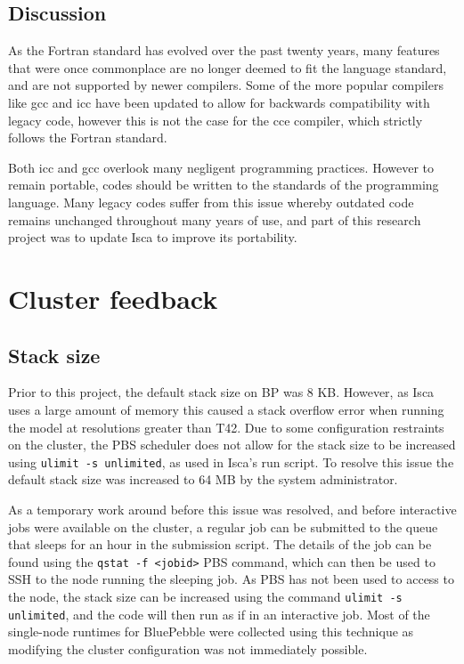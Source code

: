 \documentclass[a4paper,11pt]{report}
\begin{document}
\subsection{Discussion}
As the Fortran standard has evolved over the past twenty years, many features that were once commonplace are no longer deemed to fit the language standard, and are not supported by newer compilers. Some of the more popular compilers like \gls{gcc} and \gls{icc} have been updated to allow for backwards compatibility with legacy code, however this is not the case for the \gls{cce} compiler, which strictly follows the Fortran standard.
\par
Both \gls{icc} and \gls{gcc} overlook many negligent programming practices. However to remain portable, codes should be written to the standards of the programming language. Many legacy codes suffer from this issue whereby outdated code remains unchanged throughout many years of use, and part of this research project was to update Isca to improve its portability.


\section{Cluster feedback}
\subsection{Stack size}
Prior to this project, the default stack size on BP was 8 KB. However, as Isca uses a large amount of memory this caused a stack overflow error when running the model at resolutions greater than T42. Due to some configuration restraints on the cluster, the PBS scheduler does not allow for the stack size to be increased using \texttt{ulimit -s unlimited}, as used in Isca's run script. To resolve this issue the default stack size was increased to 64 MB by the system administrator.
\par
As a temporary work around before this issue was resolved, and before interactive jobs were available on the cluster, a regular job can be submitted to the queue that sleeps for an hour in the submission script. The details of the job can be found using the  \texttt{qstat -f <jobid>} PBS command, which can then be used to SSH to the node running the sleeping job. As PBS has not been used to access to the node, the stack size can be increased using the command \texttt{ulimit -s unlimited}, and the code will then run as if in an interactive job. Most of the single-node runtimes for BluePebble were collected using this technique as modifying the cluster configuration was not immediately possible. 
\end{document}
